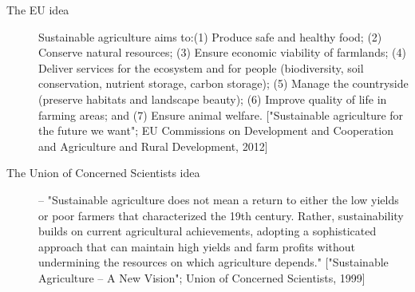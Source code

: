 \documentclass[12pt]{article}
\begin{document}
\begin{description}
	\item[The EU idea] Sustainable agriculture aims to:(1) Produce safe and healthy food; (2) Conserve natural resources; (3) Ensure economic viability of farmlands; (4) Deliver services for the ecosystem and for people (biodiversity, soil conservation, nutrient storage, carbon storage); (5) Manage the countryside (preserve habitats and landscape beauty); (6) Improve quality of life in farming areas; and (7) Ensure animal welfare. ["Sustainable agriculture for the future we want"; EU Commissions on Development and Cooperation and Agriculture and Rural Development, 2012]
\end{description}

\begin{description}
	\item[The Union of Concerned Scientists idea] -- "Sustainable agriculture does not mean a return to either the low yields or poor farmers that characterized the 19th century. Rather, sustainability builds on current agricultural achievements, adopting a sophisticated approach that can maintain high yields and farm profits without undermining the resources on which agriculture depends." ["Sustainable Agriculture -- A New Vision"; Union of Concerned Scientists, 1999]
\end{description}
\end{document}
